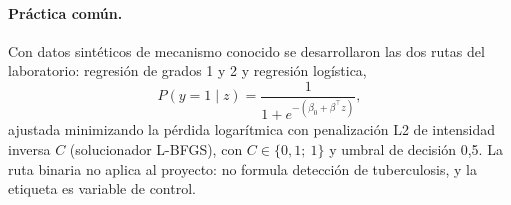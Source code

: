 \paragraph{Práctica común.} Con datos sintéticos de mecanismo conocido se
desarrollaron las dos rutas del laboratorio: regresión de grados 1 y 2 y
regresión logística,
\begin{equation}
P(y = 1 \mid z) = \frac{1}{1 + e^{-(\beta_0 + \beta^\top z)}},
\end{equation}
ajustada minimizando la pérdida logarítmica con penalización L2 de intensidad
inversa $C$ (solucionador L-BFGS), con $C \in \{0{,}1;\ 1\}$ y umbral de decisión
0,5. La ruta binaria no aplica al proyecto: no formula detección de tuberculosis, y
la etiqueta es variable de control.